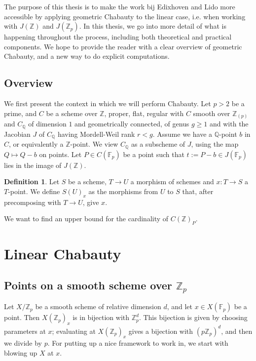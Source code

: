 \documentclass[12pt]{article}
\newcommand{\Z}{\mathbb{Z}}
\newcommand{\Q}{\mathbb{Q}}
\newcommand{\F}{\mathbb{F}}
\renewcommand{\angle}[1]{\hspace{-2pt}\left\langle #1 \right\rangle}
\theoremstyle{plain}
\theoremstyle{definition}
\newtheorem{defn}[thm]{Definition} %
\theoremstyle{remark}
\begin{document}
The purpose of this thesis is to make the work bij Edixhoven and Lido more accessible by applying geometric Chabauty to the linear case, i.e. when working with $J(\Z)$ and $J(\Z_p)$. In this thesis, we go into more detail of what is happening throughout the process, including both theoretical and practical components. We hope to provide the reader with a clear overview of geometric Chabauty, and a new way to do explicit computations.

\subsection{Overview}
We first present the context in which we will perform Chabauty. Let $p>2$ be a prime, and $C$ be a scheme over $\Z$, proper, flat, regular with $C$ smooth over $\Z_{(p)}$ and $C_\Q$ of dimension $1$ and geometrically connected, of genus $g \geq 1$ and with the Jacobian $J$ of $C_\Q$ having Mordell-Weil rank $r < g$. Assume we have a $\Q$-point $b$ in $C$, or equivalently a $\Z$-point. We view $C_\Q$ as a subscheme of $J$, using the map $Q \mapsto Q - b$ on points. Let $P \in C(\F_p)$ be a point such that $t := P - b \in J(\F_p)$ lies in the image of $J(\Z)$.

\begin{defn}
Let $S$ be a scheme, $T \to U$ a morphism of schemes and $x : T \to S$ a $T$-point. We define $S(U)_x$ as the morphisms from $U$ to $S$ that, after precomposing with $T \to U$, give $x$.
\end{defn}

We want to find an upper bound for the cardinality of $C(\Z)_P$.

\newpage
\section{Linear Chabauty}
\label{section:linchab}

\subsection{Points on a smooth scheme over \texorpdfstring{$\Z_p$}{Z\_p}}
\label{subs:smoothzppoints}
Let $X/\Z_p$ be a smooth scheme of relative dimension $d$, and let $x \in X(\F_p)$ be a point. Then $X(\Z_p)_x$ is in bijection with $\Z_p^d$. This bijection is given by choosing parameters at $x$; evaluating at $X(\Z_p)_x$ gives a bijection with $(p\Z_p)^d$, and then we divide by $p$. For putting up a nice framework to work in, we start with blowing up $X$ at $x$.
\end{document}
